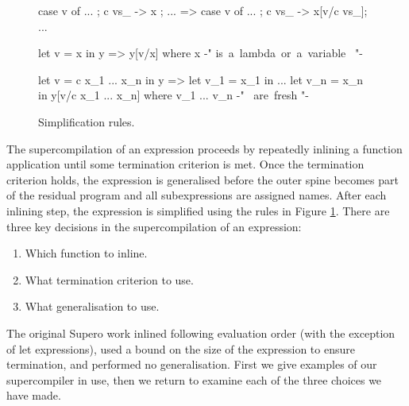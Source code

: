 \begin{comment}
\begin{figure}
\begin{code}
_O\<case x of alts_  \> =  case _O\<x\> \? of alts_
_O\<let v = x in y   \> =  let v = _O\<x\> \? in _O\<y\>
_O\<x y              \> =  _O\<x\> \? y
_O\<f                \> =  unfold f  , where f {-" \hbox{ is a non-primitive, non-CAF function} "-}
                        =  f         , otherwise
_O\<v                \> =  v
_O\<c                \> =  c
_O\< \v -> x         \> =  \v -> x
\end{code}
\caption{Optimisation rules.}
\label{fig:optimise}
\end{figure}
\end{comment}

\begin{figure}
\begin{code}
case v of {... ; c vs_ -> x ; ...}
    => case v of {... ; c vs_ -> x[v/c vs_]; ...}

let v = x in y
    => y[v/x]
    where x {-" \hbox{is a lambda or a variable } "-}

let v = c x_1 ... x_n in y
    =>  let v_1 = x_1 in
        ...
        let v_n = x_n in
        y[v/c x_1 ... x_n]
    where v_1 ... v_n {-" \hbox{ are fresh} "-}
\end{code}
\caption{Simplification rules.}
\label{fig:simplify}
\end{figure}

The supercompilation of an expression proceeds by repeatedly inlining a function application until some termination criterion is met. Once the termination criterion holds, the expression is generalised before the outer spine becomes part of the residual program and all subexpressions are assigned names. After each inlining step, the expression is simplified using the rules in Figure \ref{fig:simplify}. There are three key decisions in the supercompilation of an expression:

\begin{enumerate}
\item Which function to inline.
\item What termination criterion to use.
\item What generalisation to use.
\end{enumerate}

The original Supero work \cite{me:supero_ifl} inlined following evaluation order (with the exception of let expressions), used a bound on the size of the expression to ensure termination, and performed no generalisation. First we give examples of our supercompiler in use, then we return to examine each of the three choices we have made.

